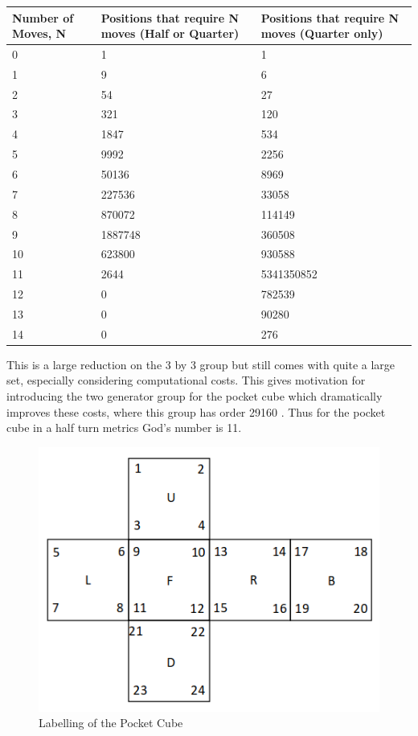\documentclass{article}
\begin{document}
\begin{center}
\label{:thistletab}
    \begin{tabular}{ | p{3cm} | p{6cm}| p{6cm} |}
    \hline
    Number of Moves, N  & Positions that require N moves (Half or Quarter) & Positions that require N moves (Quarter only) \\ \hline
     0 & 1 & 1\\ \hline
     1 & 9 & 6\\ \hline
     2 & 54 & 27\\ \hline
     3 & 321 & 120\\ \hline
     4 & 1847 & 534\\ \hline
     5 & 9992 & 2256\\ \hline
     6 & 50136 & 8969\\ \hline
     7 & 227536 & 33058\\ \hline
     8 & 870072 & 114149\\ \hline
     9 & 1887748 & 360508\\ \hline
     10 & 623800 & 930588\\ \hline
     11 & 2644 & 5341350852\\ \hline
     12 & 0 & 782539\\ \hline
     13 & 0 & 90280\\ \hline
     14 & 0 & 276\\ \hline
    \end{tabular}
\end{center}

This is a large reduction on the 3 by 3 group but still comes with quite a large set, especially considering computational costs. This gives motivation for introducing the two generator group for the pocket cube which dramatically improves these costs, where this group has order 29160 \cite{bandelow2012inside}. Thus for the pocket cube in a half turn metrics God's number is 11.

\begin{figure}[h]
\label{fig:2labelling}
\includegraphics[scale=.5]{2by2.png}
\caption{Labelling of the Pocket Cube}
\end{figure}\paragraph{}
\newpage
\end{document}
